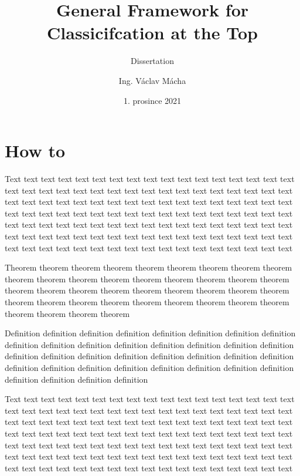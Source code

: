 \documentclass{Thesis}
\title{General Framework for Classicifcation at the Top}
\subtitle{Dissertation}
\author{Ing. Václav Mácha}
\date{1. prosince 2021}
\begin{document}
\maketitle

\chapter{How to}

Text text text text text text text text text text text text text text text text text text text text text text text text text text text text text text text text text text text text text text text text text text text text text text text text text text text text text text text text text text text text text text text text text text text text text text text text text text text text text text text text text text text text text text text text text text text text text text text text text text text text text text text text text text text text text text text text text text text text text text text

\begin{theorem}
  Theorem theorem  theorem theorem theorem theorem theorem theorem theorem theorem theorem theorem theorem theorem theorem theorem theorem theorem theorem theorem theorem theorem theorem theorem theorem theorem theorem theorem theorem theorem theorem theorem theorem theorem theorem theorem theorem theorem theorem theorem
\end{theorem}

\begin{definition}
  Definition definition definition definition definition definition definition definition definition definition definition definition definition definition definition definition definition definition definition definition definition definition definition definition definition definition definition definition definition definition definition definition definition definition definition definition
\end{definition}

Text text text text text text text text text text text text text text text text text text text text text text text text text text text text text text text text text text text text text text text text text text text text text text text text text text text text text text text text text text text text text text text text text text text text text text text text text text text text text text text text text text text text text text text text text text text text text text text text text text text text text text text text text text text text text text text text text text text text text text text
\end{document}
